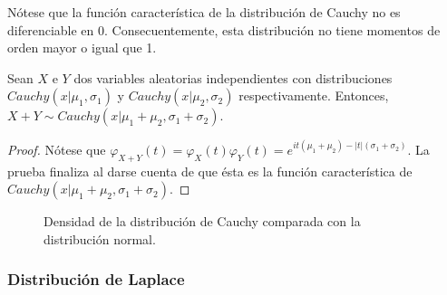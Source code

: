 \documentclass{article}
\begin{document}
Nótese que la función característica de la distribución de Cauchy no es diferenciable en $0$. Consecuentemente, esta distribución no tiene momentos de orden mayor o igual que 1.

\begin{prop}
    Sean $X$ e $Y$ dos variables aleatorias independientes con distribuciones $Cauchy(x|\mu_1, \sigma_1)$ y $Cauchy(x|\mu_2, \sigma_2)$ respectivamente. Entonces, $X+Y \sim Cauchy(x|\mu_1+\mu_2,\sigma_1+\sigma_2)$.
\end{prop}
\begin{proof}
    Nótese que $\varphi_{X+Y}(t) = \varphi_{X}(t)\varphi_{Y}(t) = e^{it(\mu_1+\mu_2) - |t| (\sigma_1+\sigma_2)}$. La prueba finaliza al darse cuenta de que ésta es la función característica de $Cauchy(x|\mu_1+\mu_2,\sigma_1+\sigma_2)$.
\end{proof}

\begin{figure}[H]
    \hspace*{-11.2cm}
    \caption{Densidad de la distribución de Cauchy comparada con la distribución normal.}
    \label{fig:cauchy}
\end{figure}


\subsubsection{Distribución de Laplace}
\end{document}

